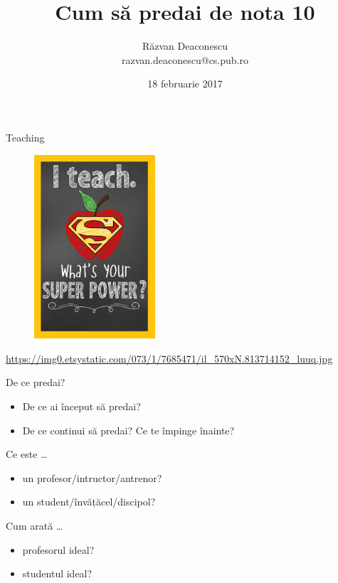 \documentclass{simple}
\title[Predare nota 10]{Cum să predai de nota 10}
\institute{Excursie VMXL4, PRECIS 708 și prietenii}
\author[Răzvan Deaconescu]{Răzvan Deaconescu \\
razvan.deaconescu@cs.pub.ro}
\date{18 februarie 2017}
\begin{document}
\frame{\titlepage}

\begin{frame}{Teaching}
  \begin{figure}
    \centering
    \includegraphics[width=0.4\textwidth]{img/super-power.jpg}
  \end{figure}
  \begin{center}
    \scriptsize
    \url{https://img0.etsystatic.com/073/1/7685471/il_570xN.813714152_luuq.jpg}
  \end{center}
\end{frame}

\begin{frame}{De ce predai?}
  \begin{itemize}
    \pause
    \item De ce ai început să predai?
    \pause
    \item De ce continui să predai? Ce te împinge înainte?
  \end{itemize}
\end{frame}

\begin{frame}{Ce este \ldots}
  \begin{itemize}
    \pause
    \item un profesor/intructor/antrenor?
    \pause
    \item un student/învățăcel/discipol?
  \end{itemize}
\end{frame}

\begin{frame}{Cum arată \ldots}
  \begin{itemize}
    \pause
    \item profesorul ideal?
    \pause
    \item studentul ideal?
  \end{itemize}
\end{frame}
\end{document}
